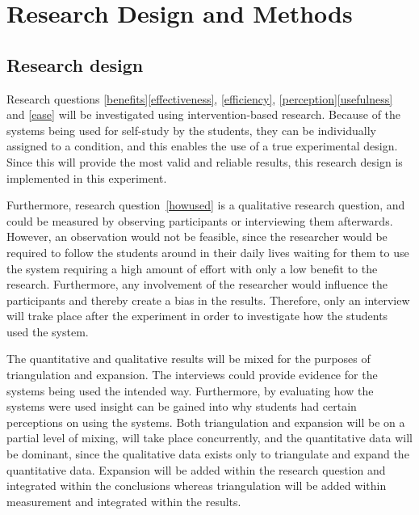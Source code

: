 \chapter{Research Design and Methods}

\section{Research design}


Research questions \ref{benefits}\ref{effectiveness}, \ref{efficiency}, \ref{perception}\ref{usefulness} and \ref{ease} will be investigated using intervention-based research. Because of the systems being used for self-study by the students, they can be individually assigned to a condition, and this enables the use of a true experimental design. Since this will provide the most valid and reliable results, this research design is implemented in this experiment.

Furthermore, research question~\ref{howused} is a qualitative research question, and could be measured by observing participants or interviewing them afterwards. However, an observation would not be feasible, since the researcher would be required to follow the students around in their daily lives waiting for them to use the system requiring a high amount of effort with only a low benefit to the research. Furthermore, any involvement of the researcher would influence the participants and thereby create a bias in the results. Therefore, only an interview will trake place after the experiment in order to investigate how the students used the system.

The quantitative and qualitative results will be mixed for the purposes of triangulation and expansion. The interviews could provide evidence for the systems being used the intended way. Furthermore, by evaluating how the systems were used insight can be gained into why students had certain perceptions on using the systems. Both triangulation and expansion will be on a partial level of mixing, will take place concurrently, and the quantitative data will be dominant, since the qualitative data exists only to triangulate and expand the quantitative data. Expansion will be added within the research question and integrated within the conclusions whereas triangulation will be added within measurement and integrated within the results. 

